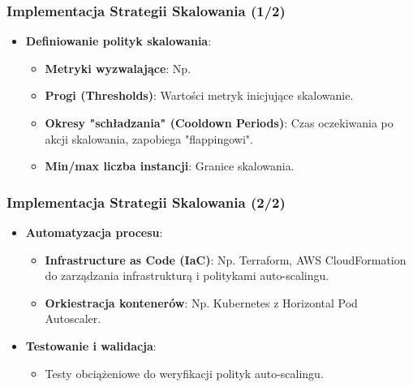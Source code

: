 \documentclass[aspectratio=169,xcolor=table]{beamer}
\begin{document}
\begin{frame}
  \frametitle{Implementacja Strategii Skalowania (1/2)}
  \begin{itemize}
    \item \textbf{Definiowanie polityk skalowania}:
        \begin{itemize}
            \item \textbf{Metryki wyzwalające}: Np. %
            \item \textbf{Progi (Thresholds)}: Wartości metryk inicjujące skalowanie.
            \item \textbf{Okresy "schładzania" (Cooldown Periods)}: Czas oczekiwania po akcji skalowania, zapobiega "flappingowi".
            \item \textbf{Min/max liczba instancji}: Granice skalowania.
        \end{itemize}
  \end{itemize}
\end{frame}

\begin{frame}
  \frametitle{Implementacja Strategii Skalowania (2/2)}
  \begin{itemize}
    \item \textbf{Automatyzacja procesu}:
        \begin{itemize}
            \item \textbf{Infrastructure as Code (IaC)}: Np. Terraform, AWS CloudFormation do zarządzania infrastrukturą i politykami auto-scalingu.
            \item \textbf{Orkiestracja kontenerów}: Np. Kubernetes z Horizontal Pod Autoscaler.
        \end{itemize}
    \item \textbf{Testowanie i walidacja}:
        \begin{itemize}
            \item Testy obciążeniowe do weryfikacji polityk auto-scalingu.
        \end{itemize}
  \end{itemize}
\end{frame}
\end{document}
